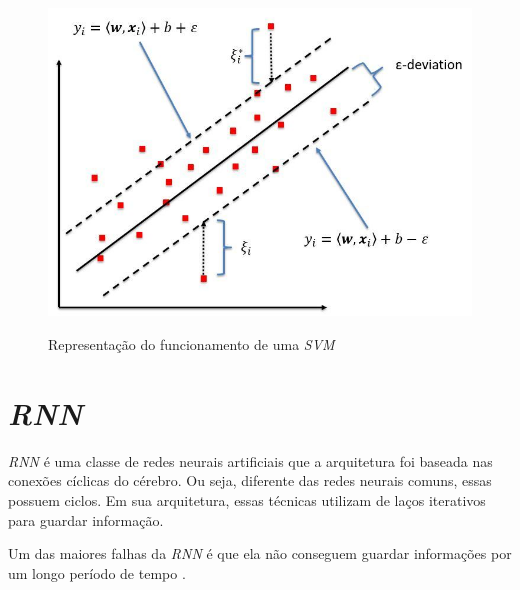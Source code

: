 



\begin{figure}[htbp]
    \centering
    \includegraphics[scale=1.0]{monography/img/models/svr_example.png}
    \label{figure:support_vector_machine}
    \caption[Representação do funcionamento de uma \textit{\acrshort{SVM}}]{Representação do funcionamento de uma \textit{\acrshort{SVM}}\footnotemark}
\end{figure}


\section{\textit{\acrfull{RNN}}}




\textit{\acrshort{RNN}} é uma classe de redes neurais artificiais que a arquitetura foi baseada nas conexões cíclicas do cérebro. Ou seja, diferente das redes neurais comuns, essas possuem ciclos. Em sua arquitetura, essas técnicas utilizam de laços iterativos para guardar informação. \cite{alex2012}


Um das maiores falhas da \textit{\acrshort{RNN}} é que ela não conseguem guardar informações por um longo período de tempo \cite{hochreiter2001gradient}.





